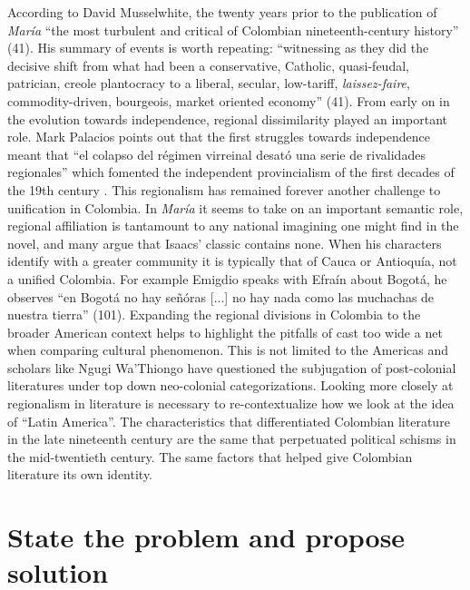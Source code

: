 \documentclass[12pt]{report}\usepackage[]{graphicx}\usepackage[]{color}
\begin{document}
\begin{spacing}{1.9}
According to David Musselwhite, the twenty years prior to the publication of \textit{María} \enquote{the most turbulent and critical of Colombian nineteenth-century history} \nocite{Musselwhite2006}(41). His summary of events is worth repeating: \enquote{witnessing as they did the decisive shift from what had been a conservative, Catholic, quasi-feudal, patrician, creole plantocracy to a liberal, secular, low-tariff, \textit{laissez-faire}, commodity-driven, bourgeois, market oriented economy} \nocite{Musselwhite2006}(41). From early on in the evolution towards independence, regional dissimilarity played an important role. Mark Palacios points out that the first struggles towards independence meant that \enquote{el colapso del régimen virreinal desató una serie de rivalidades regionales} which fomented the independent provincialism of the first decades of the 19th century \autocite[205]{Palacios2002}. This regionalism has remained forever another challenge to unification in Colombia. In \textit{María} it seems to take on an important semantic role, regional affiliation is tantamount to any national imagining one might find in the novel, and many argue that Isaacs' classic contains none. When his characters identify with a greater community it is typically that of Cauca or Antioquía, not a unified Colombia. For example Emigdio speaks with Efraín about Bogotá, he observes \enquote{en Bogotá no hay señóras [...] no hay nada como las muchachas de nuestra tierra} (101). Expanding the regional divisions in Colombia to the broader American context helps to highlight the pitfalls of cast too wide a net when comparing cultural phenomenon. This is not limited to the Americas and scholars like Ngugi Wa’Thiongo have questioned the subjugation of post-colonial literatures under top down neo-colonial categorizations.
Looking more closely at regionalism in literature is necessary to re-contextualize how we look at the idea of \enquote{Latin America}. 
The characteristics that differentiated Colombian literature in the late nineteenth century are the same that perpetuated political schisms in the mid-twentieth century. The same factors that helped give Colombian literature its own identity. 


\section{State the problem and propose solution}


\end{spacing}
\end{document}
